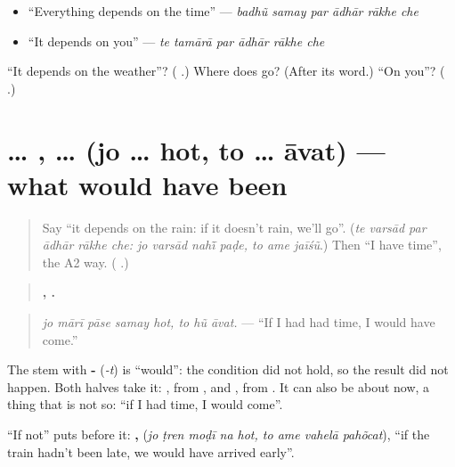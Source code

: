 \begin{itemize}
\raggedright
  \item \textquotedblleft{}Everything depends on the time\textquotedblright{} — \emph{badhũ samay par ādhār rākhe che}
  \item \textquotedblleft{}It depends on you\textquotedblright{} — \emph{te tamārā par ādhār rākhe che}
\end{itemize}

\begin{tcolorbox}[breakable,colback=teal!4,colframe=teal!35!black,title={Before you move on}]
\textquotedblleft{}It depends on the weather\textquotedblright{}? (\textbf{     }.) Where does \textbf{} go? (After its word.) \textquotedblleft{}On you\textquotedblright{}? (\textbf{ }.)
\end{tcolorbox}
\section[\texorpdfstring{\gu{જો} … \gu{હોત}, \gu{તો} … \gu{આવત} (jo … hot, to … āvat)}{જો … હોત, તો … આવત (jo … hot, to … āvat)}]{ … ,  …  (jo … hot, to … āvat) — what would have been}

\label{lesson:GU-C284-hot-to-avat}



\begin{quote}
Say \textquotedblleft{}it depends on the rain: if it doesn't rain, we'll go\textquotedblright{}. (\emph{te varsād par ādhār rākhe che: jo varsād nahī̃ paḍe, to ame jaīśũ}.) Then \textquotedblleft{}I have time\textquotedblright{}, the A2 way. (\textbf{   }.)
\end{quote}

\begin{grammarlens}[title={Grammar Lens: the -\gu{ત} form}]
\begin{quote}
\textbf{    ,   .}
\end{quote}

\begin{quote}
\emph{jo mārī pāse samay hot, to hũ āvat.} — \textquotedblleft{}If I had had time, I would have come.\textquotedblright{}
\end{quote}

The stem with \textbf{-} (\emph{-t}) is \textquotedblleft{}would\textquotedblright{}: the condition did not hold, so the result did not happen. Both halves take it: \textbf{}, from \textbf{}, and \textbf{}, from \textbf{}. It can also be about now, a thing that is not so: \textquotedblleft{}if I had time, I would come\textquotedblright{}.

\textquotedblleft{}If not\textquotedblright{} puts \textbf{} before it: \textbf{    ,    } (\emph{jo ṭren moḍī na hot, to ame vahelā pahõcat}), \textquotedblleft{}if the train hadn't been late, we would have arrived early\textquotedblright{}.
\end{grammarlens}

